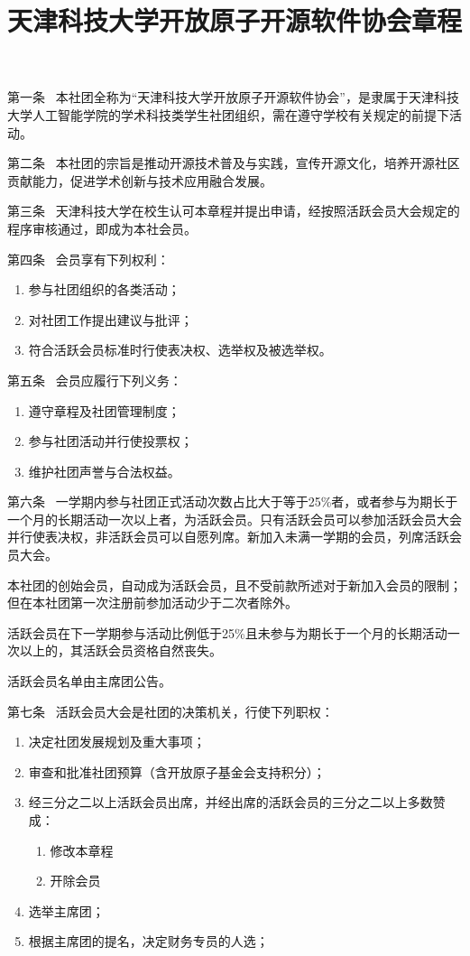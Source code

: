 \documentclass{gbt9704}
\title{天津科技大学开放原子开源软件协会章程}
\begin{document}
\maketitle


第一条~ 本社团全称为“天津科技大学开放原子开源软件协会”，是隶属于天津科技大学人工智能学院的学术科技类学生社团组织，需在遵守学校有关规定的前提下活动。


第二条~ 本社团的宗旨是推动开源技术普及与实践，宣传开源文化，培养开源社区贡献能力，促进学术创新与技术应用融合发展。


第三条~ 天津科技大学在校生认可本章程并提出申请，经按照活跃会员大会规定的程序审核通过，即成为本社会员。


第四条~ 会员享有下列权利：
\begin{enumerate}
    \item 参与社团组织的各类活动；
    \item 对社团工作提出建议与批评；
    \item 符合活跃会员标准时行使表决权、选举权及被选举权。
\end{enumerate}


第五条~ 会员应履行下列义务：
\begin{enumerate}
    \item 遵守章程及社团管理制度；
    \item 参与社团活动并行使投票权；
    \item 维护社团声誉与合法权益。
\end{enumerate}


第六条~ 一学期内参与社团正式活动次数占比大于等于25\%者，或者参与为期长于一个月的长期活动一次以上者，为活跃会员。只有活跃会员可以参加活跃会员大会并行使表决权，非活跃会员可以自愿列席。新加入未满一学期的会员，列席活跃会员大会。


本社团的创始会员，自动成为活跃会员，且不受前款所述对于新加入会员的限制；但在本社团第一次注册前参加活动少于二次者除外。


活跃会员在下一学期参与活动比例低于25\%且未参与为期长于一个月的长期活动一次以上的，其活跃会员资格自然丧失。


活跃会员名单由主席团公告。


第七条~ 活跃会员大会是社团的决策机关，行使下列职权：
\begin{enumerate}
    \item 决定社团发展规划及重大事项；
    \item 审查和批准社团预算（含开放原子基金会支持积分）；
    \item 经三分之二以上活跃会员出席，并经出席的活跃会员的三分之二以上多数赞成：
        \begin{enumerate}
            \item 修改本章程
            \item 开除会员
        \end{enumerate}
    \item 选举主席团；
    \item 根据主席团的提名，决定财务专员的人选；
\end{enumerate}
\end{document}

